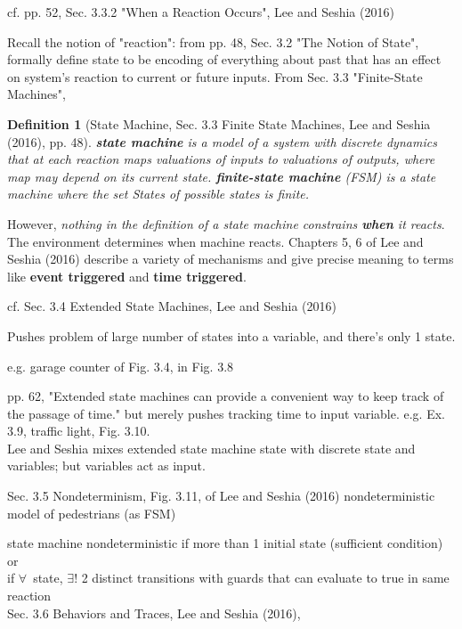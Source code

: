 \documentclass[10pt]{amsart}
\newtheorem{definition}{Definition}
\begin{document}
cf. pp. 52, Sec. 3.3.2 "When a Reaction Occurs", Lee and Seshia (2016) \cite{LeSe2016}

Recall the notion of "reaction": from pp. 48, Sec. 3.2 "The Notion of State", formally define state to be encoding of everything about past that has an effect on system's reaction to current or future inputs. From Sec. 3.3 "Finite-State Machines", 
\begin{definition}[State Machine, Sec. 3.3 Finite State Machines, Lee and Seshia (2016)\cite{LeSe2016}, pp. 48]
	\textbf{state machine} is a model of a system with discrete dynamics that at each \emph{reaction} maps valuations of inputs to valuations of outputs, where map may depend on its current state.
	\textbf{finite-state machine} (FSM) is a state machine where the set \emph{States} of possible states is finite.
\end{definition}

However, \emph{nothing in the definition of a state machine constrains \textbf{when} it reacts}. The environment determines when machine reacts. Chapters 5, 6 of Lee and Seshia (2016) \cite{LeSe2016} describe a variety of mechanisms and give precise meaning to terms like \textbf{event triggered} and \textbf{time triggered}.

cf. Sec. 3.4 Extended State Machines, Lee and Seshia (2016) \cite{LeSe2016}

Pushes problem of large number of states into a variable, and there's only 1 state.

e.g. garage counter of Fig. 3.4, in Fig. 3.8

pp. 62, "Extended state machines can provide a convenient way to keep track of the passage of time." but merely pushes tracking time to input variable. e.g. Ex. 3.9, traffic light, Fig. 3.10. \\

Lee and Seshia mixes extended state machine state with discrete state and variables; but variables act as input.

Sec. 3.5 Nondeterminism, Fig. 3.11, of Lee and Seshia (2016)\cite{LeSe2016} nondeterministic model of pedestrians (as FSM)

state machine nondeterministic if more than 1 initial state (sufficient condition) or \\
if $\forall \,$ state, $\exists !$ 2 distinct transitions with guards that can evaluate to true in same reaction \\

Sec. 3.6 Behaviors and Traces, Lee and Seshia (2016)\cite{LeSe2016},
\end{document}
